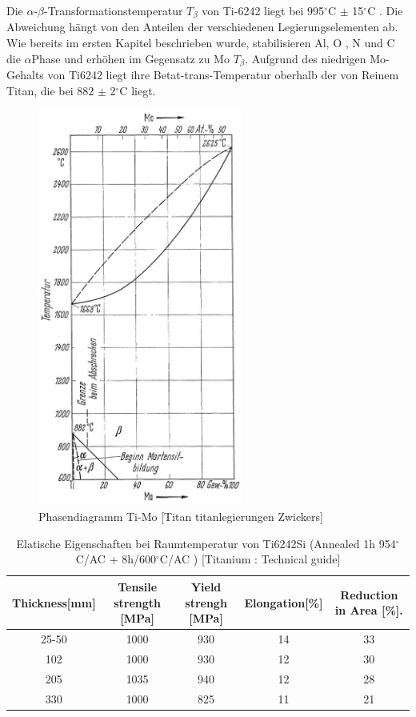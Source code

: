 Die $\alpha$-$\beta$-Transformationstemperatur $T_{\beta}$ von Ti-6242 liegt bei 995$^\circ$C $\pm$ 15$^\circ$C . Die Abweichung hängt  von den Anteilen der verschiedenen Legierungselementen ab. Wie bereits im ersten Kapitel beschrieben wurde, stabilisieren  Al, O , N und C die $\alpha$Phase und erhöhen im Gegensatz zu Mo  {$T_{\beta}$}.
Aufgrund des niedrigen Mo-Gehalts von Ti6242 liegt ihre Betat-trans-Temperatur oberhalb der von Reinem Titan, die bei 882 $\pm$ 2$^\circ$C liegt.


\begin{figure}[H]
	\centering
	\includegraphics[width= 0.6\textwidth]{Bilder/TiMo}
	\caption{Phasendiagramm Ti-Mo [Titan titanlegierungen Zwickers]}
	\label{TiMo}
\end{figure}

\begin{table}[H]
	\small
	\tabcolsep=0.09cm
	\centering	
	\begin{tabular}{|c |c |c|c |c|}
		\hline
		\centering
		Thickness[mm] & Tensile strength [MPa] & Yield strengh [MPa] & Elongation[\%]& Reduction in Area [\%]. \\
		\hline
		25-50&1000&930&14&33\\
		102&1000&930&12&30\\
		205&1035&940&12&28\\
		330&1000&825&11&21\\
		
		\hline
	\end{tabular}
	\caption{Elatische Eigenschaften bei Raumtemperatur von Ti6242Si (Annealed 1h 954$^\circ$C/AC + 8h/600$^\circ$C/AC )  [Titanium : Technical guide]}
	\label{Mecprop}
\end{table}






